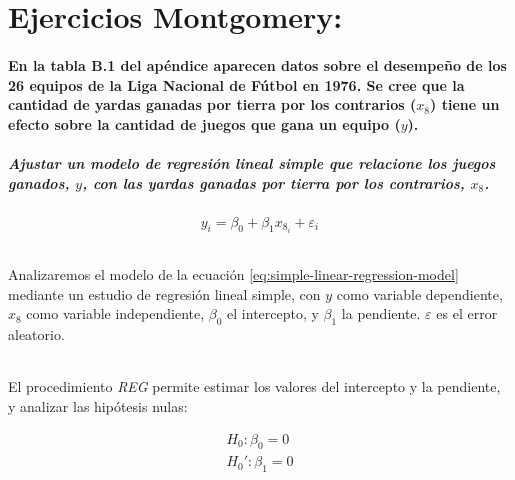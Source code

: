 \documentclass{article}
\begin{document}
  \maketitle

  \part{Ejercicios Montgomery:}

  \setcounter{section}{2}
  \subsection{En la tabla B.1 del apéndice aparecen datos sobre el desempeño de los 26 equipos de la Liga Nacional de Fútbol en 1976. Se cree que la cantidad de yardas ganadas por tierra por los contrarios ($x_8$) tiene un efecto sobre la cantidad de juegos que gana un equipo ($y$).}
  \subsubsection{Ajustar un modelo de regresión lineal simple que relacione los juegos ganados, $y$, con las yardas ganadas por tierra por los contrarios, $x_8$.}

  \begin{equation}
  \label{eq:simple-linear-regression-model}
    y_i = \beta_0 + \beta_1x_8_i + \varepsilon_i
  \end{equation}
  \paragraph{}
  Analizaremos el modelo de la ecuación \ref{eq:simple-linear-regression-model} mediante un estudio de regresión lineal simple, con $y$ como variable dependiente, $x_8$ como variable independiente, $\beta_0$ el intercepto, y $\beta_1$ la pendiente. $\varepsilon$ es el error aleatorio.

  \paragraph{}
  El procedimiento \textit{REG} permite estimar los valores del intercepto y la pendiente, y analizar las hipótesis nulas:

    \begin{align}
      H_0: \beta_0 = 0\\
      H_0': \beta_1 = 0
      \label{mont:hipotesisnulas}
    \end{align}
\end{document}
